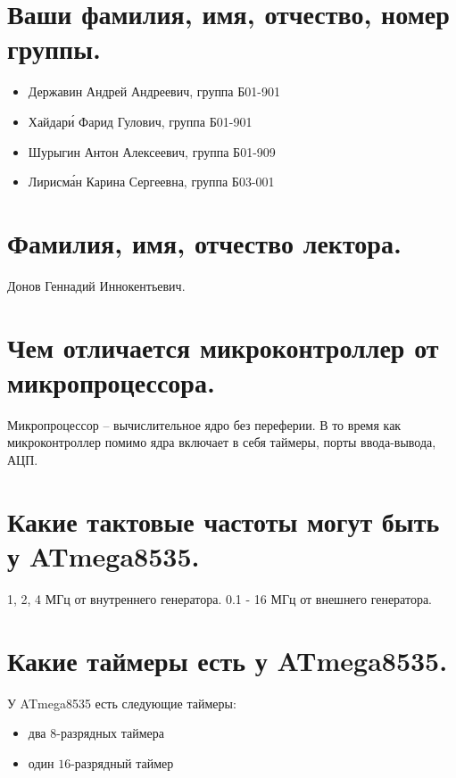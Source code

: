 \section{Ваши фамилия, имя, отчество, номер группы.}

\begin{itemize}
  \item \normalsize{{Державин Андрей Андреевич, группа Б01-901}}
  \item \normalsize{{Хайдар\'{и} Фарид Гулович, группа Б01-901}}
  \item \normalsize{{Шурыгин Антон Алексеевич, группа Б01-909}}
  \item \normalsize{{Лирисм\'{а}н Карина Сергеевна, группа Б03-001}}
\end{itemize}

\section{Фамилия, имя, отчество лектора.} 

Донов Геннадий Иннокентьевич.

\section{Чем отличается микроконтроллер от микропроцессора.}

Микропроцессор -- вычислительное ядро без переферии. В то время как микроконтроллер 
помимо ядра включает в себя таймеры, порты ввода-вывода, АЦП.

\section{Какие тактовые частоты могут быть у ATmega8535.}
1, 2, 4 МГц от внутреннего генератора.
0.1 - 16 МГц от внешнего генератора.

\section{Какие таймеры есть у ATmega8535.}
У ATmega8535 есть следующие таймеры:
\begin{itemize}
  \item два $8$-разрядных таймера
  \item один $16$-разрядный таймер
\end{itemize}

